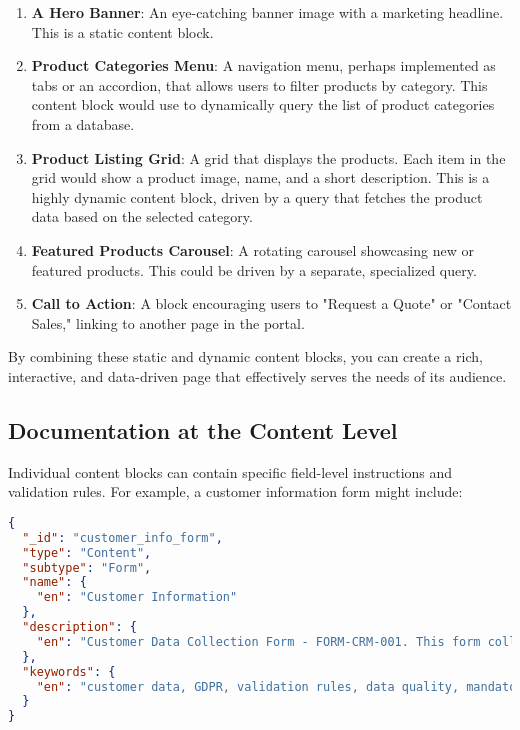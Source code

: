 \begin{enumerate}
    \item \textbf{A Hero Banner}: An eye-catching banner image with a marketing headline. This is a static content block.
    \item \textbf{Product Categories Menu}: A navigation menu, perhaps implemented as tabs or an accordion, that allows users to filter products by category. This content block would use \wbpl{} to dynamically query the list of product categories from a database.
    \item \textbf{Product Listing Grid}: A grid that displays the products. Each item in the grid would show a product image, name, and a short description. This is a highly dynamic content block, driven by a \wbpl{} query that fetches the product data based on the selected category.
    \item \textbf{Featured Products Carousel}: A rotating carousel showcasing new or featured products. This could be driven by a separate, specialized query.
    \item \textbf{Call to Action}: A block encouraging users to "Request a Quote" or "Contact Sales," linking to another page in the portal.
\end{enumerate}

By combining these static and dynamic content blocks, you can create a rich, interactive, and data-driven page that effectively serves the needs of its audience.

\subsection{Documentation at the Content Level}
\label{sec:content-documentation}

Individual content blocks can contain specific field-level instructions and validation rules. For example, a customer information form might include:

\begin{lstlisting}[language=JSON,caption={Content with Field-Level Documentation},label={lst:form-content-docs}]
{
  "_id": "customer_info_form",
  "type": "Content",
  "subtype": "Form",
  "name": {
    "en": "Customer Information"
  },
  "description": {
    "en": "Customer Data Collection Form - FORM-CRM-001. This form collects essential customer information required for quote generation. All fields marked with (*) are mandatory as per our Customer Data Policy CDP-001. Data Validation Rules: Company Name (min 2, max 100 chars), Email (valid business format). Data Protection Notice: Customer data is processed according to GDPR Article 6(1)(b). Data retention period: 7 years."
  },
  "keywords": {
    "en": "customer data, GDPR, validation rules, data quality, mandatory fields"
  }
}
\end{lstlisting}

